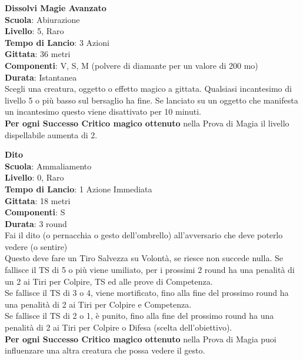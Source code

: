 \begin{multicols}{2}
\medskip\textbf{Dissolvi Magie Avanzato}\hypertarget{dissolvimagieavanzato}{}\\
\textbf{Scuola}: Abiurazione\\
\textbf{Livello}: 5, Raro\\
\textbf{Tempo di Lancio}: 3 Azioni\\
\textbf{Gittata}: 36 metri\\
\textbf{Componenti}: V, S, M (polvere di diamante per un valore di 200 mo)\\
\textbf{Durata}: Istantanea\\
Scegli una creatura, oggetto o effetto magico a gittata. Qualsiasi incantesimo di livello 5 o più basso sul bersaglio ha fine. Se lanciato su un oggetto che manifesta un incantesimo questo viene disattivato per 10 minuti.\\
\textbf{Per ogni Successo Critico magico ottenuto} nella Prova di Magia il livello dispellabile aumenta di 2.

\medskip\textbf{Dito}\\
\textbf{Scuola}: Ammaliamento\\
\textbf{Livello}: 0, Raro\\
\textbf{Tempo di Lancio}: 1 Azione Immediata\\
\textbf{Gittata}: 18 metri\\
\textbf{Componenti}: S\\
\textbf{Durata}: 3 round\\
Fai il dito (o pernacchia o gesto dell'ombrello) all'avversario che deve poterlo vedere (o sentire)\\
Questo deve fare un Tiro Salvezza su Volontà, se riesce non succede nulla.
Se fallisce il TS di 5 o più viene umiliato, per i prossimi 2 round ha una penalità di un 2 ai Tiri per Colpire, TS ed alle prove di Competenza.\\
Se fallisce il TS di 3 o 4, viene mortificato, fino alla fine del prossimo round ha una penalità di 2 ai Tiri per Colpire e Competenza.\\
Se fallisce il TS di 2 o 1, è punito, fino alla fine del prossimo round ha una penalità di 2 ai Tiri per Colpire o Difesa (scelta dell'obiettivo).\\
\textbf{Per ogni Successo Critico magico ottenuto} nella Prova di Magia puoi influenzare una altra creatura che possa vedere il gesto.


\end{multicols}
